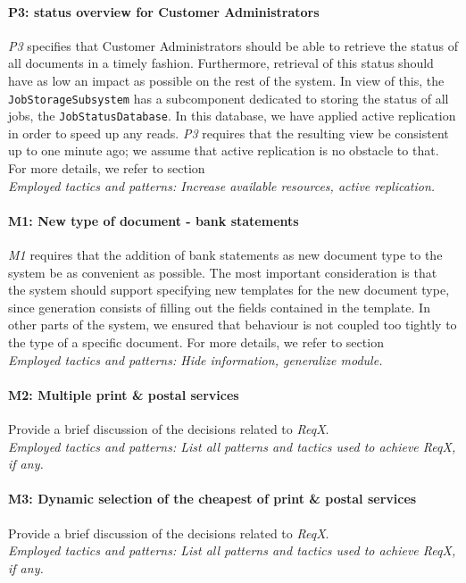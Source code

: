 \documentclass[a4paper,10pt]{article}
\begin{document}
\paragraph{P3\@: status overview for Customer Administrators} \emph{P3} specifies that Customer Administrators should be able to retrieve the status of all documents in a timely fashion. Furthermore, retrieval of this status should have as low an impact as possible on the rest of the system. In view of this, the \texttt{JobStorageSubsystem} has a subcomponent dedicated to storing the status of all jobs, the \texttt{JobStatusDatabase}. In this database, we have applied active replication in order to speed up any reads. \emph{P3} requires that the resulting view be consistent up to one minute ago; we assume that active replication is no obstacle to that. For more details, we refer to section \\
\emph{Employed tactics and patterns: Increase available resources, active replication.}
    
\paragraph{M1\@: New type of document - bank statements} \emph{M1} requires that the addition of bank statements as new document type to the system be as convenient as possible. The most important consideration is that the system should support specifying new templates for the new document type, since generation consists of filling out the fields contained in the template. In other parts of the system, we ensured that behaviour is not coupled too tightly to the type of a specific document. For more details, we refer to section \\
\emph{Employed tactics and patterns: Hide information, generalize module.}
    
\paragraph{M2\@: Multiple print \& postal services} Provide a brief discussion of the
decisions related to \emph{ReqX}.\\
\emph{Employed tactics and patterns: List all patterns and tactics used to
    achieve ReqX, if any.}
    
\paragraph{M3\@: Dynamic selection of the cheapest of print \& postal services} Provide a brief discussion of the decisions related to \emph{ReqX}.\\
\emph{Employed tactics and patterns: List all patterns and tactics used to
    achieve ReqX, if any.}
\end{document}
